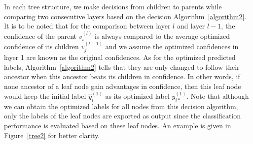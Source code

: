 \documentclass[letterpaper, 10 pt, conference]{ieeeconf}  %
\begin{document}
In each tree structure, we make decisions from children to parents while comparing two consecutive layers based on the decision Algorithm~\ref{algorithm2}. It is to be noted that for the comparison between layer $l$ and layer $l-1$, the confidence of the parent $v_i^{(l)}$ is always compared to the average optimized confidence of its children $v_j^{(l-1)}$ and we assume the optimized confidences in layer 1 are known as the original confidences. As for the optimized predicted labels, Algorithm~\ref{algorithm2} tells that they are only changed to follow their ancestor when this ancestor beats its children in confidence. In other words, if none ancestor of a leaf node gain advantages in confidence, then this leaf node would keep the initial label $\hat{y}_i^{(1)}$ as its optimized label $\hat{y}_{i*}^{(1)}$. Note that although we can obtain the optimized labels for all nodes from this decision algorithm, only the labels of the leaf nodes are exported as output since the classification performance is evaluated based on these leaf nodes. An example is given in Figure~\ref{tree2} for better clarity.





\end{document}
